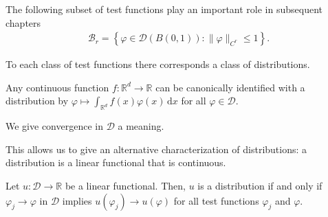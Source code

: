 The following subset of test functions play an important role in subsequent chapters
\begin{align*}
    \mathcal{B}_r = \left\{ \varphi \in \mathcal{D}(B(0,1)) : \lVert \varphi \rVert_{C^r} \leq 1 \right\}.
\end{align*}

To each class of test functions there corresponds a class of distributions.

Any continuous function \( f: \mathbb{R}^d \to \mathbb{R} \) can be canonically identified with a distribution by \( \varphi \mapsto \int_{\mathbb{R}^d} f(x) \varphi(x) \, \mathrm{d}x \) for all \( \varphi \in \mathcal{D} \).

We give {convergence in \(\mathcal{D}\)} a meaning.


This allows us to give an alternative characterization of distributions: a distribution is a linear functional that is {continuous}.

\begin{lemma}
    Let \(u: \mathcal{D} \to \mathbb{R}\) be a linear functional. Then, \(u\) is a {distribution} if and only if \( \varphi_j \to \varphi \) in \(\mathcal{D}\) implies \(u(\varphi_j) \to u(\varphi)\) for all test functions \(\varphi_j\) and \( \varphi \).
\end{lemma}


